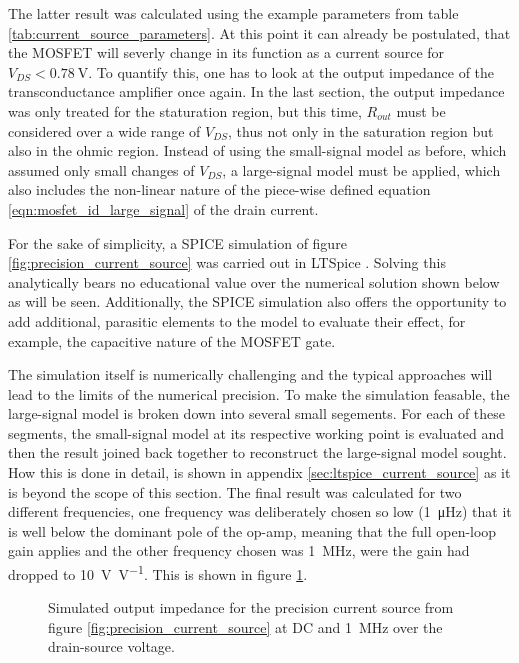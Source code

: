 The latter result was calculated using the example parameters from table \ref{tab:current_source_parameters}. At this point it can already be postulated, that the MOSFET will severly change in its function as a current source for $V_{DS} < \qty{0.78}{\V}$. To quantify this, one has to look at the output impedance of the transconductance amplifier once again. In the last section, the output impedance was only treated for the staturation region, but this time, $R_{out}$ must be considered over a wide range of $V_{DS}$, thus not only in the saturation region but also in the ohmic region. Instead of using the small-signal model as before, which assumed only small changes of $V_{DS}$, a large-signal model must be applied, which also includes the non-linear nature of the piece-wise defined equation \ref{eqn:mosfet_id_large_signal} of the drain current.

For the sake of simplicity, a SPICE simulation of figure \ref{fig:precision_current_source} was carried out in LTSpice \cite{ltspice}. Solving this analytically bears no educational value over the numerical solution shown below as will be seen. Additionally, the SPICE simulation also offers the opportunity to add additional, parasitic elements to the model to evaluate their effect, for example, the capacitive nature of the MOSFET gate.

The simulation itself is numerically challenging and the typical approaches will lead to the limits of the numerical precision. To make the simulation feasable, the large-signal model is broken down into several small segements. For each of these segments, the small-signal model at its respective working point is evaluated and then the result joined back together to reconstruct the large-signal model sought. How this is done in detail, is shown in appendix \ref{sec:ltspice_current_source} as it is beyond the scope of this section. The final result was calculated for two different frequencies, one frequency was deliberately chosen so low (\qty{1}{\micro\Hz}) that it is well below the dominant pole of the op-amp, meaning that the full open-loop gain applies and the other frequency chosen was \qty{1}{\MHz}, were the gain had dropped to \qty[per-mode=power]{10}{\V \per V}. This is shown in figure \ref{fig:ltspice_output_impedance_simulation}.

\begin{figure}[ht]
    \centering
    
    \caption{Simulated output impedance for the precision current source from figure \ref{fig:precision_current_source} at DC and \qty{1}{\MHz} over the drain-source voltage.}
    \label{fig:ltspice_output_impedance_simulation}
\end{figure}


